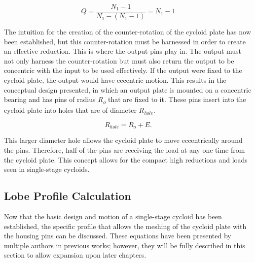 \begin{equation} \label{eq:single_stage_ratio_2}
Q = \frac{N_1-1} {N_1 - (N_1 - 1)} = N_1 -1
\end{equation}

The intuition for the creation of the counter-rotation of the cycloid plate has now been established, but this counter-rotation must be harnessed in order to create an effective reduction. This is where the output pins play in. The output must not only harness the counter-rotation but must also return the output to be concentric with the input to be used effectively. If the output were fixed to the cycloid plate, the output would have eccentric motion. This results in the conceptual design presented, in which an output plate is mounted on a concentric bearing and has pins of radius \textit{R\textsubscript{o}} that are fixed to it. These pins insert into the cycloid plate into holes that are of diameter $R_{hole}$.

\begin{equation} \label{eq:pin_hole_diam}
R_{hole} = R_o + E.
\end{equation}

This larger diameter hole allows the cycloid plate to move eccentrically around the pins. Therefore, half of the pins are receiving the load at any one time from the cycloid plate. This concept allows for the compact high reductions and loads seen in single-stage cycloids. 

\subsection{Lobe Profile Calculation} \label{ch:design:basic_calc:profile}

Now that the basic design and motion of a single-stage cycloid has been established, the specific profile that allows the meshing of the cycloid plate with the housing pins can be discussed. These equations have been presented by multiple authors in previous works; however, they will be fully described in this section to allow expansion upon later chapters. 

